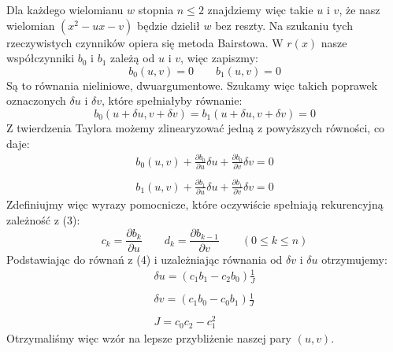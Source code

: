 \documentclass[a4paper]{article}
\begin{document}
    Dla każdego wielomianu $w$ stopnia $n \leq 2$ znajdziemy więc takie $u$ i $v$, że nasz wielomian $(x^2 - ux -v)$ będzie dzielił
    $w$ bez reszty. Na szukaniu tych rzeczywistych czynników opiera się metoda Bairstowa. W $r(x)$ nasze współczynniki $b_0$ i $b_1$
    zależą od $u$ i $v$, więc zapiszmy:
    \[
        b_0(u, v) = 0 \qquad b_1(u, v) = 0  
    \]
    Są to równania nieliniowe, dwuargumentowe. Szukamy więc takich poprawek oznaczonych $\delta u$ i $\delta v$, które spełniałyby równanie:
    \[
        b_0(u + \delta u, v + \delta v) = b_1(u + \delta u, v + \delta v) = 0  
    \]
    Z twierdzenia Taylora możemy zlinearyzować jedną z powyższych równości, co daje:
    \[
        \begin{array}{c}
            b_0(u, v) + \frac{\partial b_0}{\partial u}\delta u + \frac{\partial b_0}{\partial v}\delta v = 0  \\\\
            b_1(u, v) + \frac{\partial b_1}{\partial u}\delta u + \frac{\partial b_1}{\partial v}\delta v = 0  
        \end{array}
    \tag{4}\]
    Zdefiniujmy więc wyrazy pomocnicze, które oczywiście spełniają rekurencyjną zależność z (3):
    \[
        c_k = \frac{\partial b_k}{\partial u} \qquad d_k = \frac{\partial b_{k-1}}{\partial v} \qquad (0 \leq k \leq n) 
    \]
    Podstawiając do równań z (4) i uzależniając równania od $\delta v$ i $\delta u$ otrzymujemy:
    \[
        \begin{array}{c}
            \delta u = (c_1b_1 - c_2b_0)\frac{1}{J} \\\\
            \delta v = (c_1b_0 - c_0b_1)\frac{1}{J} \\\\
            J = c_0c_2 - c_1^2
        \end{array}
    \]
    Otrzymaliśmy więc wzór na lepsze przybliżenie naszej pary $(u, v)$.
\end{document}
